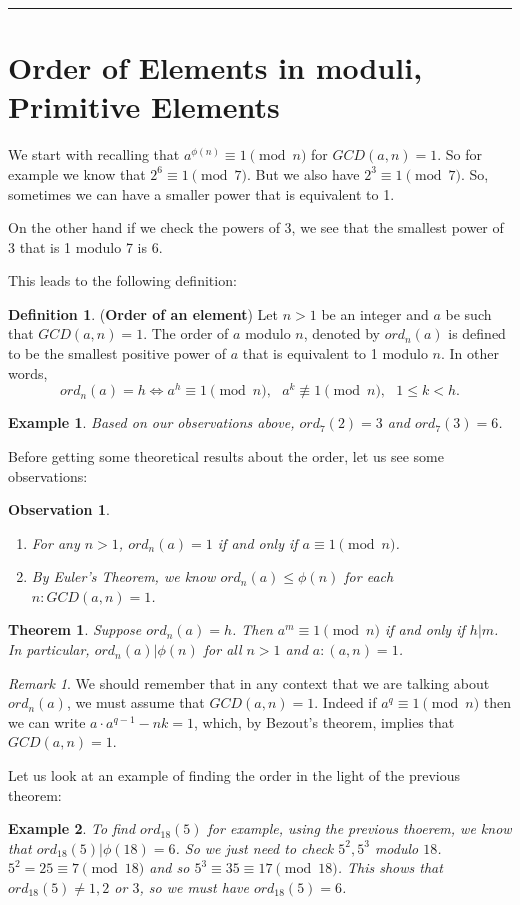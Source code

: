 \documentclass[12pt]{article}
\theoremstyle{plain}
\newtheorem{example}{Example}
\newtheorem{observation}{Observation}
\newtheorem{theorem}{Theorem}
\theoremstyle{definition}
\newtheorem{definition}{Definition}
\theoremstyle{remark}
\newtheorem{remark}{Remark}
\begin{document}
\bigskip
\hrule
\section{Order of Elements in moduli, Primitive Elements}
We start with recalling that $a^{\phi(n)} \equiv 1 \pmod{n}$ for $GCD(a,n)=1$. So for example we know that $2^6 \equiv 1 \pmod{7}$. But we also have $2^3\equiv 1 \pmod{7}$. So, sometimes we can have a smaller power that is equivalent to 1. 

On the other hand if we check the powers of 3, we see that the smallest power of 3 that is 1 modulo 7 is 6.

This leads to the following definition:
\begin{definition} ({\bf Order of an element}) Let $n>1$ be an integer and $a$ be such that $GCD(a,n)=1$. The order of $a$ modulo $n$, denoted by $ord_n(a)$ is defined to be the smallest positive power of $a$ that is equivalent to 1 modulo $n$. In other words, 
$$ord_n(a)=h \Leftrightarrow a^h \equiv 1 \pmod{n}, \:\:\: a^k\not \equiv 1 \pmod{n}, \:\:\:  1\leq k < h.$$
\end{definition}
\begin{example}
Based on our observations above, $ord_7(2)=3$ and $ord_7(3)=6$.
\end{example}

\bigskip
\noindent
Before getting some theoretical results about the order, let us see some observations:
\begin{observation}
\begin{enumerate}
    \item For any $n>1$, $ord_n(a)=1$ if and only if $a\equiv 1 \pmod{n}$.
    \item By Euler's Theorem, we know $ord_n(a) \leq \phi(n)$ for each $n:GCD(a,n)=1$.
    \end{enumerate}
\end{observation}
\begin{theorem}
Suppose $ord_n(a)=h$. Then $a^m\equiv 1 \pmod{n}$ if and only if $h|m$. In particular, $ord_n(a)|\phi(n)$ for all $n>1$ and $a: (a,n)=1$. 
\end{theorem}

\begin{remark}
We should remember that in any context that we are talking about $ord_n(a)$, we must assume that $GCD(a,n)=1$. Indeed if $a^q\equiv 1 \pmod {n}$ then we can write $a\cdot a^{q-1}-nk=1$, which, by Bezout's theorem, implies that $GCD(a,n)=1$. 
\end{remark}
Let us look at an example of finding the order in the light of the previous theorem:
\begin{example}
To find $ord_{18}(5)$ for example, using the previous thoerem, we know that $ord_{18}(5)|\phi(18)=6$. So we just need to check $5^2, 5^3$ modulo $18$. $5^2=25 \equiv 7 \pmod{18}$ and so $5^3 \equiv 35 \equiv 17 \pmod{18}$. This shows that $ord_{18}(5)\neq 1, 2$ or $3$, so we must have $ord_{18}(5)=6$.  
\end{example}
\end{document}
